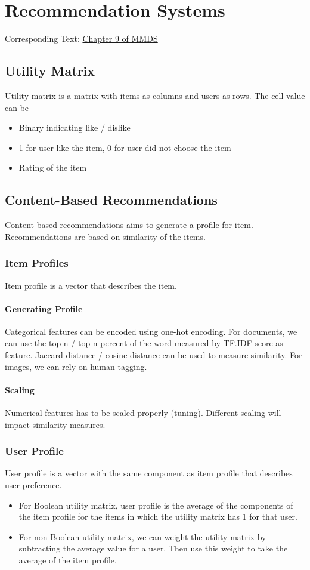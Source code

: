 \chapter{Recommendation Systems} 
Corresponding Text: \href{http://infolab.stanford.edu/~ullman/mmds/ch9.pdf}{Chapter 9 of MMDS}

\section{Utility Matrix}
Utility matrix is a matrix with items as columns and users as rows. The cell value can be 
    \begin{itemize}
        \item Binary indicating like / dislike
        \item 1 for user like the item, 0 for user did not choose the item 
        \item Rating of the item 
    \end{itemize}


\section{Content-Based Recommendations} 
Content based recommendations aims to generate a profile for item. Recommendations are based on similarity of the items. 

\subsection{Item Profiles} 
Item profile is a vector that describes the item. 
\subsubsection{Generating Profile} 
Categorical features can be encoded using one-hot encoding. For documents, we can use the top n / top n percent of the word measured by TF.IDF score as feature. Jaccard distance / cosine distance can be used to measure similarity. For images, we can rely on human tagging. 

\subsubsection{Scaling}
Numerical features has to be scaled properly (tuning). Different scaling will impact similarity measures. 

\subsection{User Profile} 
User profile is a vector with the same component as item profile that describes user preference. 
\begin{itemize}
    \item For Boolean utility matrix, user profile is the average of the components of the item profile for the items in which the utility matrix has 1 for that user. 
    \item For non-Boolean utility matrix, we can weight the utility matrix by subtracting the average value for a user. Then use this weight to take the average of the item profile. 
\end{itemize}

